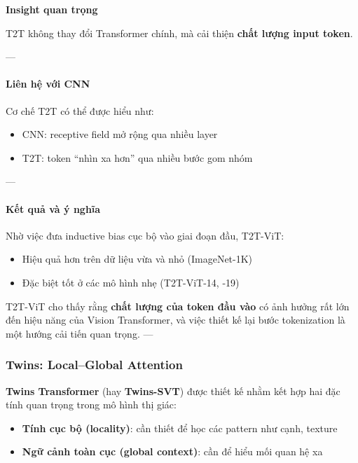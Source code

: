 \begin{mdframed}[style=infobox]
	\textbf{Insight quan trọng}
	
	T2T không thay đổi Transformer chính, mà cải thiện \textbf{chất lượng input token}.
\end{mdframed}

---

\paragraph{Liên hệ với CNN}

Cơ chế T2T có thể được hiểu như:

\begin{itemize}
	\item CNN: receptive field mở rộng qua nhiều layer
	\item T2T: token “nhìn xa hơn” qua nhiều bước gom nhóm
\end{itemize}

---

\paragraph{Kết quả và ý nghĩa}

Nhờ việc đưa inductive bias cục bộ vào giai đoạn đầu, T2T-ViT:

\begin{itemize}
	\item Hiệu quả hơn trên dữ liệu vừa và nhỏ (ImageNet-1K)
	\item Đặc biệt tốt ở các mô hình nhẹ (T2T-ViT-14, -19)
\end{itemize}

T2T-ViT cho thấy rằng \textbf{chất lượng của token đầu vào} có ảnh hưởng rất lớn đến hiệu năng của Vision Transformer, và việc thiết kế lại bước tokenization là một hướng cải tiến quan trọng.
---

\subsubsection{Twins: Local--Global Attention}
\label{subsubsec:twins}

\textbf{Twins Transformer} (hay \textbf{Twins-SVT}) \cite{Chu2021} được thiết kế nhằm kết hợp hai đặc tính quan trọng trong mô hình thị giác:
\begin{itemize}
	\item \textbf{Tính cục bộ (locality)}: cần thiết để học các pattern như cạnh, texture
	\item \textbf{Ngữ cảnh toàn cục (global context)}: cần để hiểu mối quan hệ xa
\end{itemize}

